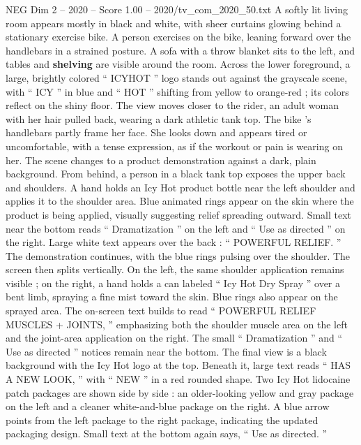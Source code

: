 \begin{textsample}{NEG Dim 2 – 2020 – Score 1.00 – 2020/tv\_com\_2020\_50.txt}  \label{ex:f2_neg_057}
A softly lit living room appears mostly in black and white, with sheer curtains glowing behind a stationary exercise bike.
A person exercises on the bike, leaning forward over the handlebars in a strained posture.
A sofa with a throw blanket sits to the left, and tables and \textbf{shelving} are visible around the room.
Across the lower foreground, a large, brightly colored “ ICYHOT ” logo stands out against the grayscale scene, with “ ICY ” in blue and “ HOT ” shifting from yellow to orange-red ; its colors reflect on the shiny floor.
The view moves closer to the rider, an adult woman with her hair pulled back, wearing a dark athletic tank top.
The bike ’s handlebars partly frame her face.
She looks down and appears tired or uncomfortable, with a tense expression, as if the workout or pain is wearing on her.
The scene changes to a product demonstration against a dark, plain background.
From behind, a person in a black tank top exposes the upper back and shoulders.
A hand holds an Icy Hot product bottle near the left shoulder and applies it to the shoulder area.
Blue animated rings appear on the skin where the product is being applied, visually suggesting relief spreading outward.
Small text near the bottom reads “ Dramatization ” on the left and “ Use as directed ” on the right.
Large white text appears over the back : “ POWERFUL RELIEF. ” The demonstration continues, with the blue rings pulsing over the shoulder.
The screen then splits vertically.
On the left, the same shoulder application remains visible ; on the right, a hand holds a can labeled “ Icy Hot Dry Spray ” over a bent limb, spraying a fine mist toward the skin.
Blue rings also appear on the sprayed area.
The on-screen text builds to read “ POWERFUL RELIEF MUSCLES + JOINTS, ” emphasizing both the shoulder muscle area on the left and the joint-area application on the right.
The small “ Dramatization ” and “ Use as directed ” notices remain near the bottom.
The final view is a black background with the Icy Hot logo at the top.
Beneath it, large text reads “ HAS A NEW LOOK, ” with “ NEW ” in a red rounded shape.
Two Icy Hot lidocaine patch packages are shown side by side : an older-looking yellow and gray package on the left and a cleaner white-and-blue package on the right.
A blue arrow points from the left package to the right package, indicating the updated packaging design.
Small text at the bottom again says, “ Use as directed. ”

\end{textsample}
